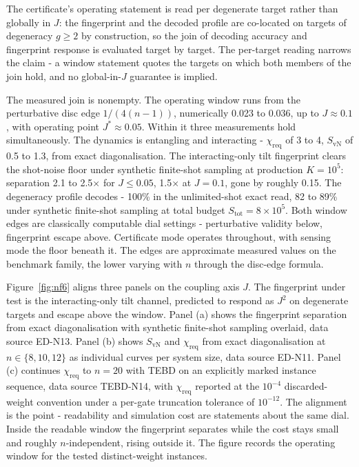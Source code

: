 The certificate's operating statement is read per degenerate target rather than globally in $J$: the fingerprint and the decoded profile are co-located on targets of degeneracy $g \ge 2$ by construction, so the join of decoding accuracy and fingerprint response is evaluated target by target. The per-target reading narrows the claim - a window statement quotes the targets on which both members of the join hold, and no global-in-$J$ guarantee is implied.

The measured join is nonempty. The operating window runs from the perturbative disc edge $1/(4(n-1))$, numerically 0.023 to 0.036, up to $J \approx 0.1$, with operating point $J^{*} \approx 0.05$. Within it three measurements hold simultaneously. The dynamics is entangling and interacting - $\chi_{\mathrm{req}}$ of 3 to 4, $S_{\mathrm{vN}}$ of 0.5 to 1.3, from exact diagonalisation. The interacting-only tilt fingerprint clears the shot-noise floor under synthetic finite-shot sampling at production $K = 10^{5}$: separation 2.1 to 2.5$\times$ for $J \le 0.05$, 1.5$\times$ at $J = 0.1$, gone by roughly 0.15. The degeneracy profile decodes - 100\% in the unlimited-shot exact read, 82 to 89\% under synthetic finite-shot sampling at total budget $S_{\mathrm{tot}} = 8 \times 10^{5}$. Both window edges are classically computable dial settings - perturbative validity below, fingerprint escape above. Certificate mode operates throughout, with sensing mode the floor beneath it. The edges are approximate measured values on the benchmark family, the lower varying with $n$ through the disc-edge formula.

Figure~\ref{fig:nf6} aligns three panels on the coupling axis $J$. The fingerprint under test is the interacting-only tilt channel, predicted to respond as $J^{2}$ on degenerate targets and escape above the window. Panel (a) shows the fingerprint separation from exact diagonalisation with synthetic finite-shot sampling overlaid, data source ED-N13. Panel (b) shows $S_{\mathrm{vN}}$ and $\chi_{\mathrm{req}}$ from exact diagonalisation at $n \in \{8, 10, 12\}$ as individual curves per system size, data source ED-N11. Panel (c) continues $\chi_{\mathrm{req}}$ to $n = 20$ with TEBD on an explicitly marked instance sequence, data source TEBD-N14, with $\chi_{\mathrm{req}}$ reported at the $10^{-4}$ discarded-weight convention under a per-gate truncation tolerance of $10^{-12}$. The alignment is the point - readability and simulation cost are statements about the same dial. Inside the readable window the fingerprint separates while the cost stays small and roughly $n$-independent, rising outside it. The figure records the operating window for the tested distinct-weight instances.
